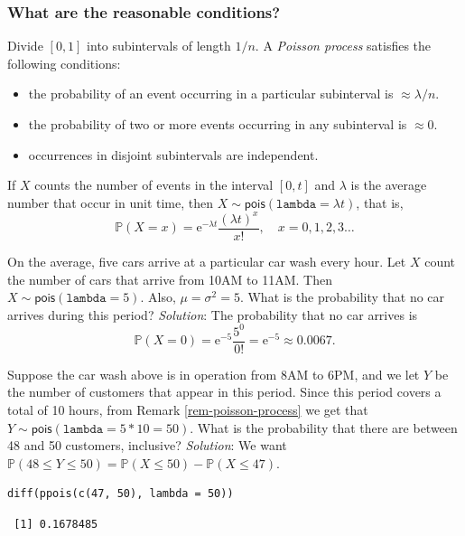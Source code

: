 \documentclass[captions=tableheading]{scrbook}
\begin{document}
\subsubsection{What are the reasonable conditions?}
\label{sec-5-6-3-2}


Divide \([0,1]\) into subintervals of length \(1/n\). A \emph{Poisson process} satisfies the following conditions:
\begin{itemize}
\item the probability of an event occurring in a particular subinterval is \(\approx\lambda/n\).
\item the probability of two or more events occurring in any subinterval is \(\approx 0\).
\item occurrences in disjoint subintervals are independent.
\end{itemize}

\begin{rem}

If \(X\) counts the number of events in the interval \([0,t]\) and \(\lambda\) is the average number that occur in unit time, then \(X\sim\mathsf{pois}(\mathtt{lambda}=\lambda t)\), that is,
\begin{equation}
\mathbb{P}(X=x)=\mathrm{e}^{-\lambda t}\frac{(\lambda t)^{x}}{x!},\quad x=0,1,2,3\ldots
\end{equation}
\end{rem}

\begin{example}
On the average, five cars arrive at a particular car wash every hour. Let \(X\) count the number of cars that arrive from 10AM to 11AM. Then \(X\sim\mathsf{pois}(\mathtt{lambda}=5)\). Also, \(\mu=\sigma^{2}=5\). What is the probability that no car arrives during this period? 
\emph{Solution}: The probability that no car arrives is
\[
\mathbb{P}(X=0)=\mathrm{e}^{-5}\frac{5^{0}}{0!}=\mathrm{e}^{-5}\approx0.0067.
\]
\end{example}

\begin{example}
Suppose the car wash above is in operation from 8AM to 6PM, and we let \(Y\) be the number of customers that appear in this period. Since this period covers a total of 10 hours, from Remark \ref{rem-poisson-process} we get that \(Y\sim\mathsf{pois}(\mathtt{lambda}=5\ast10=50)\). What is the probability that there are between 48 and 50 customers, inclusive? 
\emph{Solution}: We want \(\mathbb{P}(48\leq Y\leq50)=\mathbb{P}(X\leq50)-\mathbb{P}(X\leq47)\). 


\lstset{language=R}
\begin{lstlisting}
diff(ppois(c(47, 50), lambda = 50))
\end{lstlisting}

\begin{verbatim}
 [1] 0.1678485
\end{verbatim}

\end{example}
\end{document}
